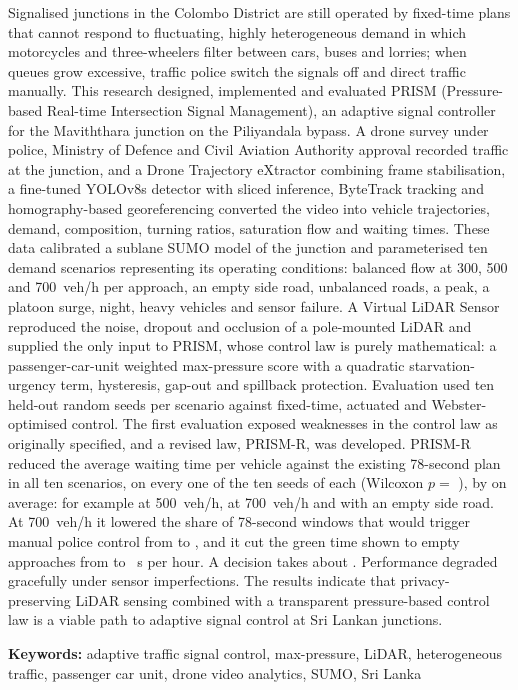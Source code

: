 Signalised junctions in the Colombo District are still operated by fixed-time plans that cannot respond to fluctuating, highly heterogeneous demand in which motorcycles and three-wheelers filter between cars, buses and lorries; when queues grow excessive, traffic police switch the signals off and direct traffic manually. This research designed, implemented and evaluated PRISM (Pressure-based Real-time Intersection Signal Management), an adaptive signal controller for the Maviththara junction on the Piliyandala bypass. A drone survey under police, Ministry of Defence and Civil Aviation Authority approval recorded traffic at the junction, and a Drone Trajectory eXtractor combining frame stabilisation, a fine-tuned YOLOv8s detector with sliced inference, ByteTrack tracking and homography-based georeferencing converted the video into vehicle trajectories, demand, composition, turning ratios, saturation flow and waiting times. These data calibrated a sublane SUMO model of the junction and parameterised ten demand scenarios representing its operating conditions: balanced flow at 300, 500 and 700~veh/h per approach, an empty side road, unbalanced roads, a peak, a platoon surge, night, heavy vehicles and sensor failure. A Virtual LiDAR Sensor reproduced the noise, dropout and occlusion of a pole-mounted LiDAR and supplied the only input to PRISM, whose control law is purely mathematical: a passenger-car-unit weighted max-pressure score with a quadratic starvation-urgency term, hysteresis, gap-out and spillback protection. Evaluation used ten held-out random seeds per scenario against fixed-time, actuated and Webster-optimised control. The first evaluation exposed weaknesses in the control law as originally specified, and a revised law, PRISM-R, was developed. PRISM-R reduced the average waiting time per vehicle against the existing 78-second plan in all ten scenarios, on every one of the ten seeds of each (Wilcoxon $p =$ ), by  on average: for example  at 500~veh/h,  at 700~veh/h and  with an empty side road. At 700~veh/h it lowered the share of 78-second windows that would trigger manual police control from  to , and it cut the green time shown to empty approaches from  to ~s per hour. A decision takes about . Performance degraded gracefully under sensor imperfections. The results indicate that privacy-preserving LiDAR sensing combined with a transparent pressure-based control law is a viable path to adaptive signal control at Sri Lankan junctions.

\vspace{0.4cm}
\noindent\textbf{Keywords:} adaptive traffic signal control, max-pressure, LiDAR, heterogeneous traffic, passenger car unit, drone video analytics, SUMO, Sri Lanka
